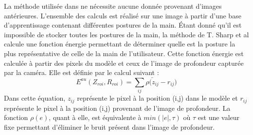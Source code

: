 La méthode utilisée dans \cite{export:238453} ne nécessite aucune donnée provenant d'images antérieures. L'ensemble
des calculs est réalisé sur une image à partir d'une base d'apprentissage contenant différentes postures de la
main. \'{E}tant donné qu'il est impossible de stocker toutes les postures de la main, la méthode de T. Sharp et al \cite{export:238453}
calcule une fonction énergie permettant de déterminer quelle est la posture la plus représentative de celle de la main
de l'utilisateur. Cette fonction énergie est calculée à partir des pixels du modèle et ceux de l'image de profondeur
capturée par la caméra. Elle est définie par le calcul suivant :
\begin{equation}
 E^{au}(Z_{roi}, R_{roi}) = \sum_{ij} \bar{\rho(z_{ij}} - r_{ij})
\end{equation}
Dans cette équation, $z_{ij}$ représente le pixel à la position (i,j) dans le modèle et $r_{ij}$ représente le pixel à la position (i,j)
provenant de l'image de profondeur. La fonction $\rho(e)$, quant à elle, est équivalente à $min(|e|,\tau)$ où $\tau$ est une valeur fixe permettant d'éliminer le bruit présent dans l'image de profondeur.



